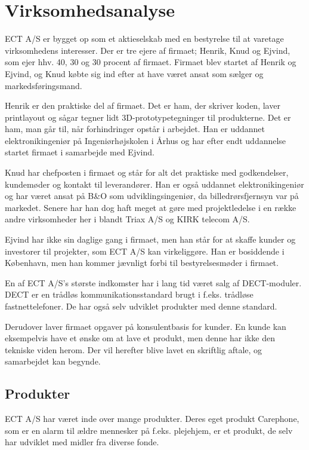 \chapter{Virksomhedsanalyse}

ECT A/S er bygget op som et aktieselskab med en bestyrelse til at varetage virksomhedens interesser. Der er tre ejere af firmaet; Henrik, Knud og Ejvind, som ejer hhv. 40, 30 og 30 procent af firmaet. Firmaet blev startet af Henrik og Ejvind, og Knud købte sig ind efter at have været ansat som sælger og markedsføringsmand.

Henrik er den praktiske del af firmaet. Det er ham, der skriver koden, laver printlayout og sågar tegner lidt 3D-prototypetegninger til produkterne. Det er ham, man går til, når forhindringer opstår i arbejdet. Han er uddannet elektronikingeniør på Ingeniørhøjskolen i Århus og har efter endt uddannelse startet firmaet i samarbejde med Ejvind.

Knud har chefposten i firmaet og står for alt det praktiske med godkendelser, kundemøder og kontakt til leverandører. Han er også uddannet elektronikingeniør og har været ansat på B\&O som udviklingsingeniør, da billedrørsfjernsyn var på markedet. Senere har han dog haft meget at gøre med projektledelse i en række andre virksomheder her i blandt Triax A/S og KIRK telecom A/S.

Ejvind har ikke sin daglige gang i firmaet, men han står for at skaffe kunder og investorer til projekter, som ECT A/S kan virkeliggøre. Han er bosiddende i København, men han kommer jævnligt forbi til bestyrelsesmøder i firmaet.

En af ECT A/S's største indkomster har i lang tid været salg af DECT-moduler. DECT er en trådløs kommunikationsstandard brugt i f.eks. trådløse fastnettelefoner. De har også selv udviklet produkter med denne standard.

Derudover laver firmaet opgaver på konsulentbasis for kunder. En kunde kan eksempelvis have et ønske om at lave et produkt, men denne har ikke den tekniske viden herom. Der vil herefter blive lavet en skriftlig aftale, og samarbejdet kan begynde.

\newpage
\section{Produkter}

ECT A/S har været inde over mange produkter. Deres eget produkt Carephone, som er en alarm til ældre mennesker på f.eks. plejehjem, er et produkt, de selv har udviklet med midler fra diverse fonde.

